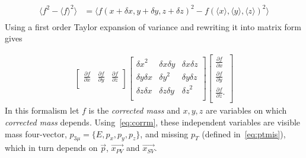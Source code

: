 \begin{equation}
\begin{aligned}
	\langle f^{2}-\langle f \rangle^{2} \rangle  &=  \langle f(x+\delta x, y+\delta y, z+\delta z)^{2} - f(\langle x \rangle, \langle y \rangle, \langle z \rangle)^{2} \rangle \\
\end{aligned}
\end{equation}
Using a first order Taylor expansion of variance and rewriting it into matrix form gives

\begin{equation}
\begin{aligned}
       \begin{bmatrix}
		\frac{\partial{f}}{\partial{x}} & \frac{\partial{f}}{\partial{y}} & \frac{\partial{f}}{\partial{z}} \\
       \end{bmatrix}
       \begin{bmatrix}
	       {\delta x}^{2} & \delta x \delta y & \delta x \delta z  \\ 
	        \delta y \delta x & {\delta y}^{2} & \delta y \delta z  \\
	        \delta z \delta x & \delta z \delta y & {\delta z}^{2}  \\
       \end{bmatrix}
       \begin{bmatrix}
		\frac{\partial{f}}{\partial{x}} \\ \frac{\partial{f}}{\partial{y}} \\\frac{\partial{f}}{\partial{z}}. \\
       \end{bmatrix}
\end{aligned}
\end{equation}
In this formalism let $f$ is the \emph{corrected mass} and $x,y,z$ are variables on which \emph{corrected mass} depends. Using~\autoref{eq:corrm}, these independent variables are visible mass four-vector, $p_{3\mu}=\{E,p_{x},p_{y},p_{z}\}$, and missing $p_{T}$ (defined in~\autoref{eq:ptmis}), which in turn depends on $\vec{p}$, $\vec{x_{PV}}$ and $\vec{x_{SV}}$.

